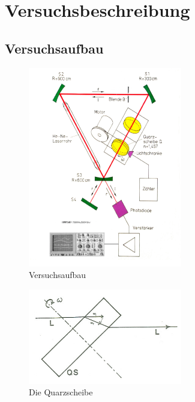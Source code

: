 \section{Versuchsbeschreibung}

\subsection{Versuchsaufbau}

\begin{figure}[H]
	\centering \includegraphics[width=0.6\textwidth]{bilder/aufbau.jpg}
	\caption{Versuchsaufbau}
\end{figure}

\begin{figure}[H]
	\centering \includegraphics[width=0.6\textwidth]{bilder/wiwr.jpg}
	\caption{Die Quarzscheibe}
\end{figure}